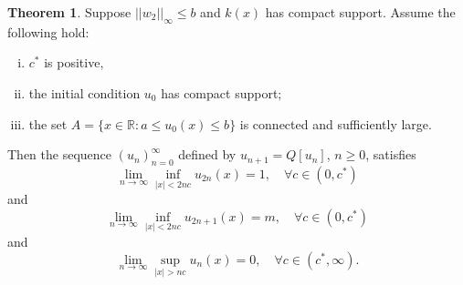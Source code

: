 \documentclass[11pt]{article}
\theoremstyle{definition}
\newtheorem{thm}{Theorem}
\numberwithin{equation}{section}
\numberwithin{thm}{section}
\begin{document}
\begin{thm} Suppose $||w_2||_\infty \leq b$ and $k(x)$ has compact support. Assume the following hold:

\begin{enumerate}[i.)]
\item $c^*$ is positive,\
\item the initial condition $u_0$ has compact support;
\item the set $A=\{x\in\mathbb R:a\leq u_0(x)\leq b\}$  is connected and sufficiently large.
\end{enumerate}
 Then the sequence $(u_n)_{n=0}^{\infty}$ defined by $u_{n+1}=Q[u_n]$, $n\geq 0$, satisfies
\begin{equation}
\lim_{n\to\infty}\inf_{|x|<2nc}u_{2n}(x)=1, \quad \forall c\in(0,c^*)
\end{equation}
and
\begin{equation}
\lim_{n\to\infty}\inf_{|x|<2nc}u_{2n+1}(x)=m, \quad \forall c\in(0,c^*)
\end{equation}
and 
\begin{equation}
\lim_{n\to\infty}\sup_{|x|>nc}u_n(x)=0, \quad \forall c\in(c^*,\infty).
\end{equation}
\end{thm}
\end{document}
